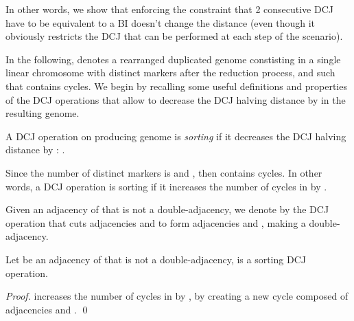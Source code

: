 \documentclass{llncs}
\begin{document}
In other words, we show that enforcing the constraint that 2 consecutive DCJ have to be equivalent to a BI doesn't change the distance (even though it obviously restricts the DCJ that can be performed at each step of the scenario). 







In
the following,  denotes a rearranged duplicated genome 
constisting in a single linear chromosome with  distinct markers
after the reduction process, and such that  contains  cycles.
We begin by recalling some useful definitions and properties of the DCJ
operations that allow to decrease the DCJ halving distance by  in the resulting genome. 

\begin{definition}
A DCJ operation on  producing genome  is \emph{sorting} if it decreases the DCJ halving distance by : .
\end{definition}

Since the number of distinct markers  is  and , then  contains  cycles. In other words, a DCJ operation is sorting if it increases the number of cycles in   by .

Given  an adjacency of  that is not a double-adjacency,
we denote by  the DCJ operation that cuts adjacencies  and   to form adjacencies  and  , making  a double-adjacency. 

\begin{property}
Let   be an adjacency of  that is not a double-adjacency,
  is a sorting DCJ operation.
\end{property}
\begin{proof}
 increases the number of cycles in   by , by creating a new cycle composed of adjacencies   and  . \qed
\end{proof}

 
\end{document}

